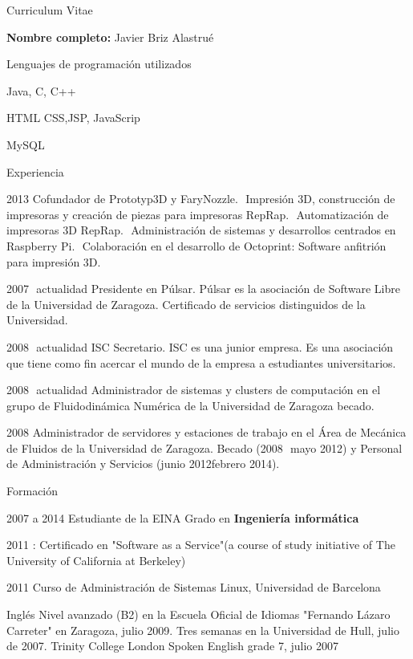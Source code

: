 \begin{cv}{Curriculum Vitae}

\vspace{0.8cm}
\textbf{Nombre completo:} Javier Briz Alastrué
\vspace{0.8cm}

\begin{cvlist}{Lenguajes de programación utilizados}
\item Java, C, C++
\item HTML CSS,JSP, JavaScrip
\item MySQL
\end{cvlist}

\begin{cvlist}{Experiencia}

	\item[2013] Co­fundador de Prototyp3D y FaryNozzle.
­ \subitem Impresión 3D, construcción de impresoras y creación de piezas para impresoras RepRap.
­ \subitem Automatización de impresoras 3D RepRap.
­ \subitem Administración de sistemas y desarrollos centrados en Raspberry Pi.
­ \subitem Colaboración en el desarrollo de Octoprint: Software anfitrión para impresión 3D.
\item[2007  ­  actualidad]  Presidente  en  Púlsar.  Púlsar  es  la  asociación  de  Software  Libre  de  la  Universidad  de  Zaragoza.
\subitem Certificado de servicios distinguidos de la Universidad.
\item[2008  ­ actualidad  ISC]  Secretario.  ISC  es  una  junior empresa. Es una  asociación que tiene como  fin acercar el  mundo
de la empresa a estudiantes universitarios.
\item[2008  ­ actualidad]  Administrador  de  sistemas  y  clusters de computación en el grupo de Fluidodinámica Numérica de
la Universidad de Zaragoza becado.
\item[2008]  Administrador  de  servidores  y  estaciones  de   trabajo  en   el  Área  de  Mecánica  de  Fluidos  de  la
Universidad  de  Zaragoza.  Becado  (2008  ­  mayo  2012)  y  Personal   de  Administración   y  Servicios  (junio  2012­febrero
2014).
	

\end{cvlist}

\begin{cvlist}{Formación}

	\item[2007 a 2014] Estudiante de la EINA
		Grado en \textbf{Ingeniería informática}
	\item[2011]: Certificado en "Software as a Service"(a course of study initiative of The University of California at Berkeley) 
	\item [2011] Curso de Administración de Sistemas Linux, Universidad de Barcelona
	\item [Inglés] Nivel avanzado (B2) en la Escuela Oficial de Idiomas "Fernando Lázaro Carreter" en Zaragoza, julio 2009.
Tres semanas en la Universidad de Hull, julio de 2007. Trinity College London Spoken English grade 7, julio 2007


\end{cvlist}

\end{cv}